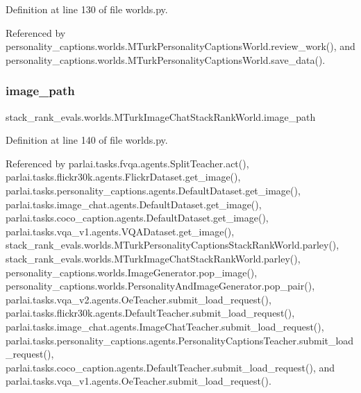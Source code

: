 Definition at line 130 of file worlds.\+py.



Referenced by personality\+\_\+captions.\+worlds.\+M\+Turk\+Personality\+Captions\+World.\+review\+\_\+work(), and personality\+\_\+captions.\+worlds.\+M\+Turk\+Personality\+Captions\+World.\+save\+\_\+data().

\mbox{\label{classstack__rank__evals_1_1worlds_1_1MTurkImageChatStackRankWorld_ab29ce4a87b80b18e820b97c3f5f991cd}} 
\subsubsection{\texorpdfstring{image\+\_\+path}{image\_path}}
{\footnotesize\ttfamily stack\+\_\+rank\+\_\+evals.\+worlds.\+M\+Turk\+Image\+Chat\+Stack\+Rank\+World.\+image\+\_\+path}



Definition at line 140 of file worlds.\+py.



Referenced by parlai.\+tasks.\+fvqa.\+agents.\+Split\+Teacher.\+act(), parlai.\+tasks.\+flickr30k.\+agents.\+Flickr\+Dataset.\+get\+\_\+image(), parlai.\+tasks.\+personality\+\_\+captions.\+agents.\+Default\+Dataset.\+get\+\_\+image(), parlai.\+tasks.\+image\+\_\+chat.\+agents.\+Default\+Dataset.\+get\+\_\+image(), parlai.\+tasks.\+coco\+\_\+caption.\+agents.\+Default\+Dataset.\+get\+\_\+image(), parlai.\+tasks.\+vqa\+\_\+v1.\+agents.\+V\+Q\+A\+Dataset.\+get\+\_\+image(), stack\+\_\+rank\+\_\+evals.\+worlds.\+M\+Turk\+Personality\+Captions\+Stack\+Rank\+World.\+parley(), stack\+\_\+rank\+\_\+evals.\+worlds.\+M\+Turk\+Image\+Chat\+Stack\+Rank\+World.\+parley(), personality\+\_\+captions.\+worlds.\+Image\+Generator.\+pop\+\_\+image(), personality\+\_\+captions.\+worlds.\+Personality\+And\+Image\+Generator.\+pop\+\_\+pair(), parlai.\+tasks.\+vqa\+\_\+v2.\+agents.\+Oe\+Teacher.\+submit\+\_\+load\+\_\+request(), parlai.\+tasks.\+flickr30k.\+agents.\+Default\+Teacher.\+submit\+\_\+load\+\_\+request(), parlai.\+tasks.\+image\+\_\+chat.\+agents.\+Image\+Chat\+Teacher.\+submit\+\_\+load\+\_\+request(), parlai.\+tasks.\+personality\+\_\+captions.\+agents.\+Personality\+Captions\+Teacher.\+submit\+\_\+load\+\_\+request(), parlai.\+tasks.\+coco\+\_\+caption.\+agents.\+Default\+Teacher.\+submit\+\_\+load\+\_\+request(), and parlai.\+tasks.\+vqa\+\_\+v1.\+agents.\+Oe\+Teacher.\+submit\+\_\+load\+\_\+request().

